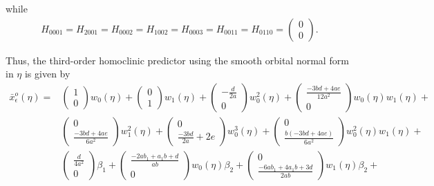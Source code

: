 while
\begin{align*}
H_{0001} = H_{2001} = H_{0002} = H_{1002} = H_{0003} = H_{0011} = H_{0110} = 
\begin{pmatrix} 0 \\ 0 \end{pmatrix}\!.
\end{align*}

Thus, the third-order homoclinic predictor using the smooth orbital normal form
in $\eta$ is given by 
\begin{equation*}
\begin{aligned}
    \bar x_\epsilon^o(\eta) =& \begin{pmatrix} 1 \\  0 \end{pmatrix} w_0(\eta) +
\begin{pmatrix} 0 \\ 1 \end{pmatrix} w_1(\eta) + 
\begin{pmatrix} -\frac{d}{2 a} \\ 0 \end{pmatrix} w_0^2(\eta) + 
\begin{pmatrix} \frac{-3 b d + 4 a e}{12 a^2} \\  0 \end{pmatrix} w_0(\eta) w_1(\eta) + \\
        & \begin{pmatrix} 0 \\ \frac{-3 b d + 4 a e}{6 a^2} \end{pmatrix} w_1^2(\eta) +
          \begin{pmatrix} 0 \\ \frac{-3 b d}{2 a} + 2 e \end{pmatrix} w_0^3(\eta) +
          \begin{pmatrix} 0 \\ \frac{b (-3 b d + 4 a e)}{6 a^2} \end{pmatrix} w_0^2(\eta) w_1(\eta) + \\
        & \begin{pmatrix} \frac{d}{4 a^2} \\  0 \end{pmatrix} \beta_1 +
          \begin{pmatrix} \frac{-2 a b_1 + a_1 b + d}{a b} \\  0 \end{pmatrix} w_0(\eta) \beta_2 +
          \begin{pmatrix} 0 \\ \frac{-6 a b_1 + 4 a_1 b + 3 d}{2 a b} \end{pmatrix} w_1(\eta) \beta_2 + \\

\end{aligned}
\end{equation*}
